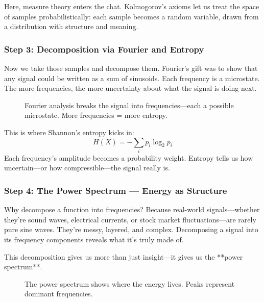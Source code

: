 Here, measure theory enters the chat. Kolmogorov’s axioms let us treat the space of samples probabilistically: each sample becomes a random variable, drawn from a distribution with structure and meaning.

\subsubsection{Step 3: Decomposition via Fourier and Entropy}
Now we take those samples and decompose them. Fourier’s gift was to show that any signal could be written as a sum of sinusoids. Each frequency is a microstate. The more frequencies, the more uncertainty about what the signal is doing next.

\begin{figure}[H]
\centering
{}
\caption{Fourier analysis breaks the signal into frequencies—each a possible microstate. More frequencies = more entropy.}
\end{figure}

This is where Shannon’s entropy kicks in:
\[
H(X) = - \sum_i p_i \log_2 p_i
\]
Each frequency’s amplitude becomes a probability weight. Entropy tells us how uncertain—or how compressible—the signal really is.


\subsubsection{Step 4: The Power Spectrum — Energy as Structure}

Why decompose a function into frequencies? Because real-world signals—whether they’re sound waves, electrical currents, or stock market fluctuations—are rarely pure sine waves. They’re messy, layered, and complex. Decomposing a signal into its frequency components reveals what it’s truly made of.

This decomposition gives us more than just insight—it gives us the **power spectrum**.

\begin{figure}[H]
\centering
{}
\caption{The power spectrum shows where the energy lives. Peaks represent dominant frequencies.}
\end{figure}

